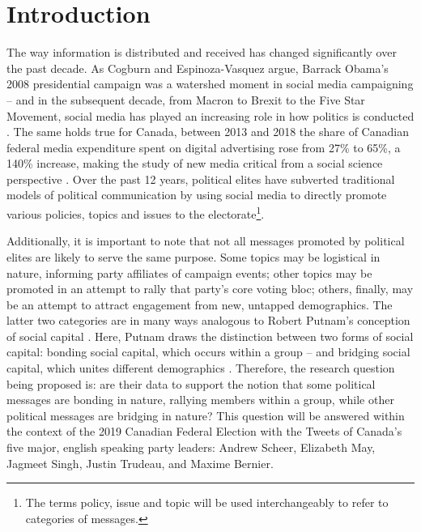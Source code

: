\tableofcontents

\section{Introduction}

The way information is distributed and received has changed significantly over
the past decade. As Cogburn and Espinoza-Vasquez argue, Barrack Obama’s 2008
presidential campaign was a watershed moment in social media campaigning – and
in the subsequent decade, from Macron to Brexit to the Five Star Movement,
social media has played an increasing role in how politics is conducted
\cite{cogburn2011networked}.  The same holds true for Canada, between 2013 and
2018 the share of Canadian federal media expenditure spent on digital
advertising rose from 27\% to 65\%, a 140\% increase, making the study of new
media critical from a social science perspective
\cite{annualReportCanadaAdvertisingActivities_2018}. Over the past 12 years,
political elites have subverted traditional models of political communication by
using social media to directly promote various policies, topics and issues to
the electorate\footnote{The
terms policy, issue and topic will be used interchangeably to refer to
categories of messages.}\cite{mcnair2017introduction}.

Additionally, it is important to note that not all messages promoted by
political elites are likely to serve the same purpose. Some topics may be
logistical in nature, informing party affiliates of campaign events; other
topics may be promoted in an attempt to rally that party's core voting bloc;
others, finally, may be an attempt to attract
engagement from new, untapped demographics. The latter two categories are in
many ways analogous to Robert Putnam's conception of social capital
\cite{putnam2001social}. Here, Putnam draws the distinction between two forms
of social capital: bonding social capital, which occurs within a group -- and
bridging social capital, which unites different demographics
\cite{putnam2001social}. Therefore, the research question being proposed is:
are their data to support the notion that some political messages are bonding in
nature, rallying members within a group, while other political messages are
bridging in nature? This question will be answered within the context of the
2019 Canadian Federal Election with the Tweets of Canada’s five major, english
speaking party leaders: Andrew Scheer, Elizabeth May, Jagmeet Singh, Justin
Trudeau, and Maxime Bernier. 

